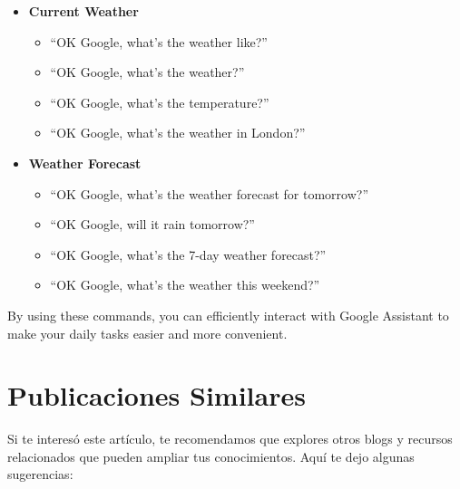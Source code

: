 \documentclass[
  jou,
  floatsintext,
  longtable,
  a4paper,
  nolmodern,
  notxfonts,
  notimes,
  12pt,
  colorlinks=true,linkcolor=blue,citecolor=blue,urlcolor=blue]{apa7}
\providecommand{\tightlist}{%
  \setlength{\itemsep}{0pt}\setlength{\parskip}{0pt}}
\begin{document}
\begin{itemize}
\tightlist
\item
  \textbf{Current Weather}

  \begin{itemize}
  \tightlist
  \item
    ``OK Google, what's the weather like?''
  \item
    ``OK Google, what's the weather?''
  \item
    ``OK Google, what's the temperature?''
  \item
    ``OK Google, what's the weather in London?''
  \end{itemize}
\item
  \textbf{Weather Forecast}

  \begin{itemize}
  \tightlist
  \item
    ``OK Google, what's the weather forecast for tomorrow?''
  \item
    ``OK Google, will it rain tomorrow?''
  \item
    ``OK Google, what's the 7-day weather forecast?''
  \item
    ``OK Google, what's the weather this weekend?''
  \end{itemize}
\end{itemize}

By using these commands, you can efficiently interact with Google
Assistant to make your daily tasks easier and more convenient.

\section{Publicaciones Similares}\label{publicaciones-similares}

Si te interesó este artículo, te recomendamos que explores otros blogs y
recursos relacionados que pueden ampliar tus conocimientos. Aquí te dejo
algunas sugerencias:
\end{document}
